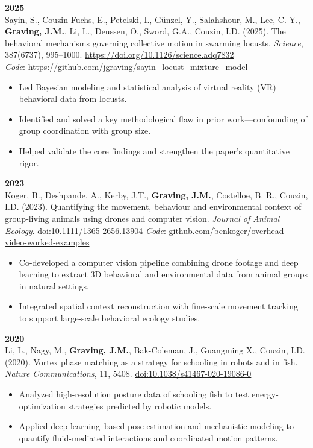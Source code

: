 \documentclass[10pt,letterpaper]{article}
\begin{document}
	\vspace{4pt}
	\textbf{2025}\\
	Sayin, S., Couzin-Fuchs, E., Petelski, I., G\"unzel, Y., Salahshour, M., Lee, C.-Y., \textbf{Graving, J.M.}, Li, L., Deussen, O., Sword, G.A., Couzin, I.D. (2025). The behavioral mechanisms governing collective motion in swarming locusts. \textit{Science}, 387(6737), 995–1000. \href{https://doi.org/10.1126/science.adq7832}{https://doi.org/10.1126/science.adq7832} \\ \textit{Code}: \href{https://github.com/jgraving/sayin_locust_mixture_model}{https://github.com/jgraving/sayin\_locust\_mixture\_model}
	\begin{itemize}
		\item Led Bayesian modeling and statistical analysis of virtual reality (VR) behavioral data from locusts.
		\item Identified and solved a key methodological flaw in prior work—confounding of group coordination with group size.
		\item Helped validate the core findings and strengthen the paper's quantitative rigor.
	\end{itemize}
	
	\vspace{4pt}
	\textbf{2023}\\
	Koger, B., Deshpande, A., Kerby, J.T., \textbf{Graving, J.M.}, Costelloe, B. R., Couzin, I.D. (2023). Quantifying the movement, behaviour and environmental context of group‐living animals using drones and computer vision. \textit{Journal of Animal Ecology}. \href{https://doi.org/10.1111/1365-2656.13904}{doi:10.1111/1365-2656.13904} \textit{Code}: \href{https://github.com/benkoger/overhead-video-worked-examples}{github.com/benkoger/overhead-video-worked-examples}
	\begin{itemize}
		\item Co-developed a computer vision pipeline combining drone footage and deep learning to extract 3D behavioral and environmental data from animal groups in natural settings.
		\item Integrated spatial context reconstruction with fine-scale movement tracking to support large-scale behavioral ecology studies.
	\end{itemize}
	\newpage
	\vspace{4pt}
	\textbf{2020}\\
	Li, L., Nagy, M., \textbf{Graving, J.M.}, Bak-Coleman, J., Guangming X., Couzin, I.D. (2020). Vortex phase matching as a strategy for schooling in robots and in fish. \textit{Nature Communications}, 11, 5408. \href{https://doi.org/10.1038/s41467-020-19086-0}{doi:10.1038/s41467-020-19086-0}
	\begin{itemize}
		\item Analyzed high-resolution posture data of schooling fish to test energy-optimization strategies predicted by robotic models.
		\item Applied deep learning–based pose estimation and mechanistic modeling to quantify fluid-mediated interactions and coordinated motion patterns.
	\end{itemize}
	
\end{document}
